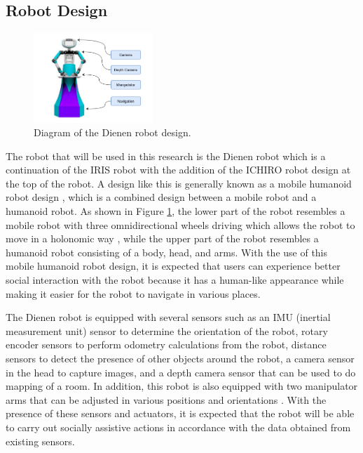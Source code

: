 \subsection{Robot Design}
\label{subsec:robotdesign}

\begin{figure} [ht]
  \centering
  \includegraphics[width=0.4\textwidth]{images/robot-design.png}
  \caption{Diagram of the Dienen robot design.}
  \label{fig:robotdesign}
\end{figure}

The robot that will be used in this research is the Dienen robot which is a continuation of the IRIS robot \citep{dikairono2020}\citep{zanuar2019} with the addition of the ICHIRO robot \citep{muhtadin2019} design at the top of the robot.
A design like this is generally known as a mobile humanoid robot design \citep{mohamed2012},
  which is a combined design between a mobile robot and a humanoid robot.
As shown in Figure \ref{fig:robotdesign},
  the lower part of the robot resembles a mobile robot with three omnidirectional wheels driving which allows the robot to move in a holonomic way \citep{oliveira2008},
  while the upper part of the robot resembles a humanoid robot consisting of a body, head, and arms.
With the use of this mobile humanoid robot design,
  it is expected that users can experience better social interaction with the robot because it has a human-like appearance \citep{rossi2018} while making it easier for the robot to navigate in various places.

The Dienen robot is equipped with several sensors such as an IMU (inertial measurement unit) sensor to determine the orientation of the robot,
  rotary encoder sensors to perform odometry calculations from the robot,
  distance sensors to detect the presence of other objects around the robot,
  a camera sensor in the head to capture images,
  and a depth camera sensor that can be used to do mapping of a room.
In addition, this robot is also equipped with two manipulator arms that can be adjusted in various positions and orientations \citep{iqbal2012}.
With the presence of these sensors and actuators,
  it is expected that the robot will be able to carry out socially assistive actions in accordance with the data obtained from existing sensors.

